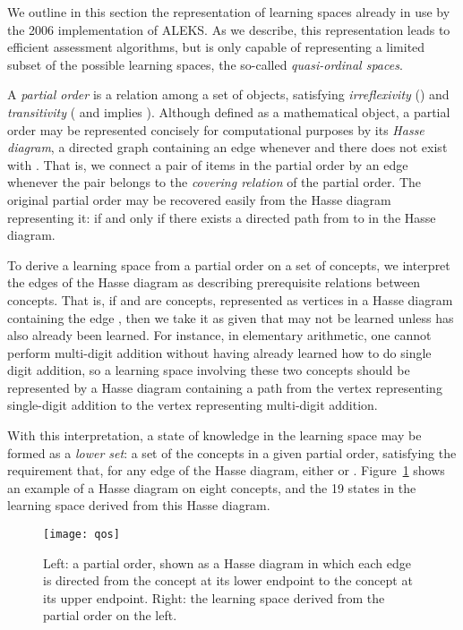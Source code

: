 \documentclass[11pt]{llncs}
\begin{document}
{We outline in this section the representation of learning spaces already in use by the 2006 implementation of ALEKS.
As we describe, this representation leads to efficient assessment algorithms, but is only capable of representing a limited subset of the possible learning spaces, the so-called \emph{quasi-ordinal spaces}.

A \emph{partial order} is a relation  among a set of objects, satisfying \emph{irreflexivity} () and
\emph{transitivity} ( and  implies ).
Although defined as a mathematical object, a partial order may be represented concisely for computational purposes by its \emph{Hasse diagram}, a directed graph containing an edge  whenever  and there does not exist  with . That is, we connect a pair of items in the partial order by an edge whenever the pair belongs to the \emph{covering relation} of the partial order.  The original partial order may be recovered easily from the Hasse diagram representing it:  if and only if there exists a directed path from  to  in the Hasse diagram.

To derive a learning space from a partial order on a set of concepts, we interpret the edges of the Hasse diagram as describing prerequisite relations between concepts. That is, if  and  are concepts, represented as vertices in a Hasse diagram containing the edge , then we take it as given that  may not be learned unless  has also already been learned. For instance, in elementary arithmetic, one cannot perform multi-digit addition without having already learned how to do single digit addition, so a learning space involving these two concepts should be represented by a Hasse diagram containing a path from the vertex representing single-digit addition to the vertex representing multi-digit addition.

With this interpretation, a state of knowledge in the learning space may be formed as a \emph{lower set}: a set  of the concepts in a given partial order, satisfying the requirement that, for any edge  of the Hasse diagram, either  or . Figure~\ref{fig:qos} shows an example of a Hasse diagram on eight concepts, and the 19 states in the learning space derived from this Hasse diagram.

\begin{figure}[t]
\centering\texttt{[image: qos]}
\caption{Left: a partial order, shown as a Hasse diagram in which each edge is directed from the concept at its lower endpoint to the concept at its upper endpoint. Right: the learning space derived from the partial order on the left.}
\label{fig:qos}
\end{figure}

}
\end{document}
